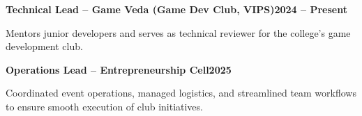 \documentclass[letterpaper,10pt]{article}
\newcommand{\heading}[2]{
  \hspace{10pt}#1\hfill#2\\
}
\newcommand{\headingBf}[2]{
  \heading{\textbf{#1}}{\textbf{#2}}
}
\newenvironment{resume_list}{
  \vspace{-7pt}
  \begin{itemize}[itemsep=-2px, parsep=1pt, leftmargin=30pt]
}{
  \end{itemize}
}
\begin{document}
  \headingBf{Technical Lead -- Game Veda (Game Dev Club, VIPS)}{2024 -- Present}
  \begin{resume_list}
    \item Mentors junior developers and serves as technical reviewer for the college's game development club.
  \end{resume_list}

   \headingBf{Operations Lead -- Entrepreneurship Cell}{2025}
  \begin{resume_list}
    \item Coordinated event operations, managed logistics, and streamlined team workflows to ensure smooth execution of club initiatives.
  \end{resume_list}
\end{document}
